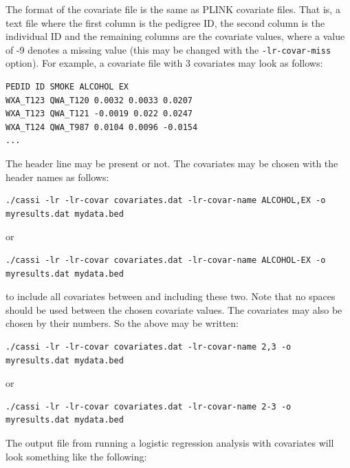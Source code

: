 \documentclass[a4paper,12pt]{article}
\newcommand{\code}[1]{{\footnotesize{{\tt #1}}}}
\begin{document}
The format of the covariate file is the same as PLINK covariate files. That is, a text file where the first column is the pedigree ID, the second column is the individual ID and the remaining columns are the covariate values, where a value of -9 denotes a missing value (this may be changed with the \code{-lr-covar-miss} option). For example, a covariate file with 3 covariates may look as follows: 
\vspace{0.35cm} \begin{lstlisting}
PEDID ID SMOKE ALCOHOL EX
WXA_T123 QWA_T120 0.0032 0.0033 0.0207
WXA_T123 QWA_T121 -0.0019 0.022 0.0247
WXA_T124 QWA_T987 0.0104 0.0096 -0.0154
...

\end{lstlisting} \vspace{0.35cm}
The header line may be present or not. The covariates may be chosen with the header names as follows: 
\vspace{0.35cm} \begin{lstlisting}
./cassi -lr -lr-covar covariates.dat -lr-covar-name ALCOHOL,EX -o myresults.dat mydata.bed

\end{lstlisting} \vspace{0.35cm}
or 
\vspace{0.35cm} \begin{lstlisting}
./cassi -lr -lr-covar covariates.dat -lr-covar-name ALCOHOL-EX -o myresults.dat mydata.bed

\end{lstlisting} \vspace{0.35cm}
to include all covariates between and including these two. Note that no spaces should be used between the chosen covariate values. The covariates may also be chosen by their numbers. So the above may be written: 
\vspace{0.35cm} \begin{lstlisting}
./cassi -lr -lr-covar covariates.dat -lr-covar-name 2,3 -o myresults.dat mydata.bed

\end{lstlisting} \vspace{0.35cm}
or 
\vspace{0.35cm} \begin{lstlisting}
./cassi -lr -lr-covar covariates.dat -lr-covar-name 2-3 -o myresults.dat mydata.bed

\end{lstlisting} \vspace{0.35cm}
The output file from running a logistic regression analysis with covariates will look something like the following: 
\end{document}
